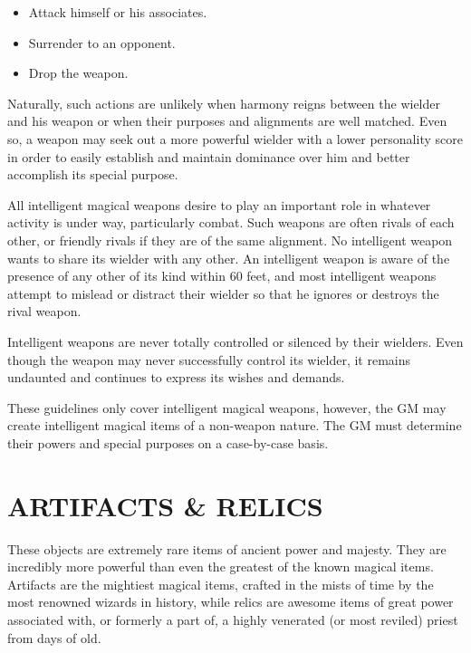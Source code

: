 \begin{multicols}{2}
\begin{itemize}
\item Attack himself or his associates.

\item Surrender to an opponent.

\item Drop the weapon.
\end{itemize}

Naturally, such actions are unlikely when harmony reigns between the wielder and his weapon or when their purposes and alignments are well matched.  Even so, a weapon may seek out a more powerful wielder with a lower personality score in order to easily establish and maintain dominance over him and better accomplish its special purpose.   

All intelligent magical weapons desire to play an important role in whatever activity is under way, particularly combat.  Such weapons are often rivals of each other, or friendly rivals if they are of the same alignment.  No intelligent weapon wants to share its wielder with any other.  An intelligent weapon is aware of the presence of any other of its kind within 60 feet, and most intelligent weapons attempt to mislead or distract their wielder so that he ignores or destroys the rival weapon.  

Intelligent weapons are never totally controlled or silenced by their wielders.  Even though the weapon may never successfully control its wielder, it remains undaunted and continues to express its wishes and demands. 

These guidelines only cover intelligent magical weapons, however, the GM may create intelligent magical items of a non-weapon nature.  The GM must determine their powers and special purposes on a case-by-case basis. 
 
\section{ARTIFACTS \& RELICS}

These objects are extremely rare items of ancient power and majesty.  They are incredibly more powerful than even the greatest of the known magical items.  Artifacts are the mightiest magical items, crafted in the mists of time by the most renowned wizards in history, while relics are awesome items of great power associated with, or formerly a part of, a highly venerated (or most reviled) priest from days of old.  


\end{multicols}
